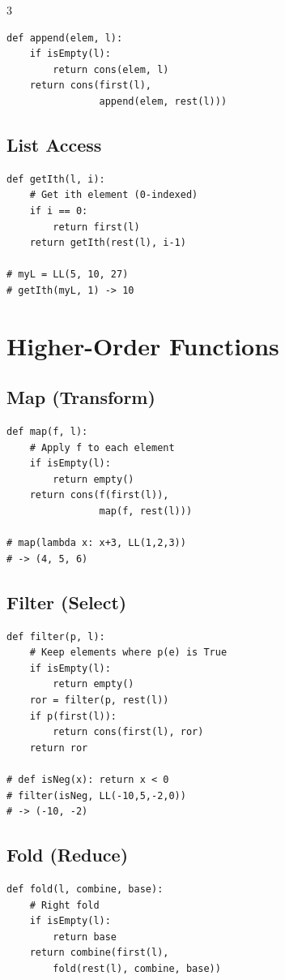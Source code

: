 \documentclass[8pt,landscape,a4paper]{article}
\begin{document}
\begin{multicols}{3}
\begin{lstlisting}
def append(elem, l):
    if isEmpty(l):
        return cons(elem, l)
    return cons(first(l), 
                append(elem, rest(l)))
\end{lstlisting}

\subsection*{List Access}
\begin{lstlisting}
def getIth(l, i):
    # Get ith element (0-indexed)
    if i == 0:
        return first(l)
    return getIth(rest(l), i-1)

# myL = LL(5, 10, 27)
# getIth(myL, 1) -> 10
\end{lstlisting}

\columnbreak

\section*{Higher-Order Functions}

\subsection*{Map (Transform)}
\begin{lstlisting}
def map(f, l):
    # Apply f to each element
    if isEmpty(l):
        return empty()
    return cons(f(first(l)), 
                map(f, rest(l)))

# map(lambda x: x+3, LL(1,2,3))
# -> (4, 5, 6)
\end{lstlisting}

\subsection*{Filter (Select)}
\begin{lstlisting}
def filter(p, l):
    # Keep elements where p(e) is True
    if isEmpty(l):
        return empty()
    ror = filter(p, rest(l))
    if p(first(l)):
        return cons(first(l), ror)
    return ror

# def isNeg(x): return x < 0
# filter(isNeg, LL(-10,5,-2,0))
# -> (-10, -2)
\end{lstlisting}

\subsection*{Fold (Reduce)}
\begin{lstlisting}
def fold(l, combine, base):
    # Right fold
    if isEmpty(l):
        return base
    return combine(first(l), 
        fold(rest(l), combine, base))


\end{lstlisting}
\end{multicols}
\end{document}
